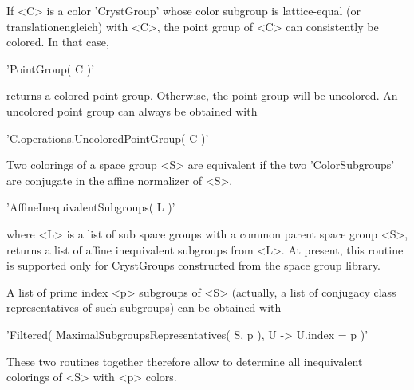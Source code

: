 %

If <C> is a color 'CrystGroup' whose color  subgroup is lattice-equal (or
translationengleich) with <C>, the point group of <C> can consistently be
colored. In that case,

'PointGroup( C )'                             

returns  a colored   point group.  Otherwise,  the  point   group will be
uncolored. An uncolored point group can always be obtained with

'C.operations.UncoloredPointGroup( C )'

%

Two  colorings of    a space  group   <S>   are equivalent    if the  two
'ColorSubgroups' are conjugate in the affine normalizer of <S>.

'AffineInequivalentSubgroups( L )'

where <L> is a list of sub space groups with  a common parent space group
<S>, returns  a  list  of affine  inequivalent  subgroups  from  <L>.  At
present, this routine is  supported only for CrystGroups constructed from
the space group library.

A list of prime index <p> subgroups of <S> (actually, a list of conjugacy
class representatives of such subgroups) can be obtained with

'Filtered( MaximalSubgroupsRepresentatives( S, p ), U -> U.index = p )'

These two routines together therefore allow to determine all inequivalent
colorings of <S> with <p> colors.







